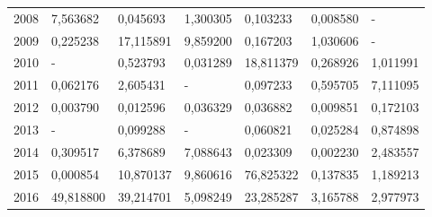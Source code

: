 \begin{table}
\begin{tabular}{p{1cm}p{2cm}p{2cm}p{2cm}p{2cm}p{2cm}p{2cm}}
 2008 &                  7,563682 &                                      0,045693 &                                    1,300305 &                       0,103233 &                                    0,008580 &                                   - \\
 2009 &                  0,225238 &                                     17,115891 &                                    9,859200 &                       0,167203 &                                    1,030606 &                                   - \\
 2010 &                         - &                                      0,523793 &                                    0,031289 &                      18,811379 &                                    0,268926 &                            1,011991 \\
 2011 &                  0,062176 &                                      2,605431 &                                           - &                       0,097233 &                                    0,595705 &                            7,111095 \\
 2012 &                  0,003790 &                                      0,012596 &                                    0,036329 &                       0,036882 &                                    0,009851 &                            0,172103 \\
 2013 &                         - &                                      0,099288 &                                           - &                       0,060821 &                                    0,025284 &                            0,874898 \\
 2014 &                  0,309517 &                                      6,378689 &                                    7,088643 &                       0,023309 &                                    0,002230 &                            2,483557 \\
 2015 &                  0,000854 &                                     10,870137 &                                    9,860616 &                      76,825322 &                                    0,137835 &                            1,189213 \\
 2016 &                 49,818800 &                                     39,214701 &                                    5,098249 &                      23,285287 &                                    3,165788 &                            2,977973 \\
\bottomrule
\end{tabular}
\end{table}
